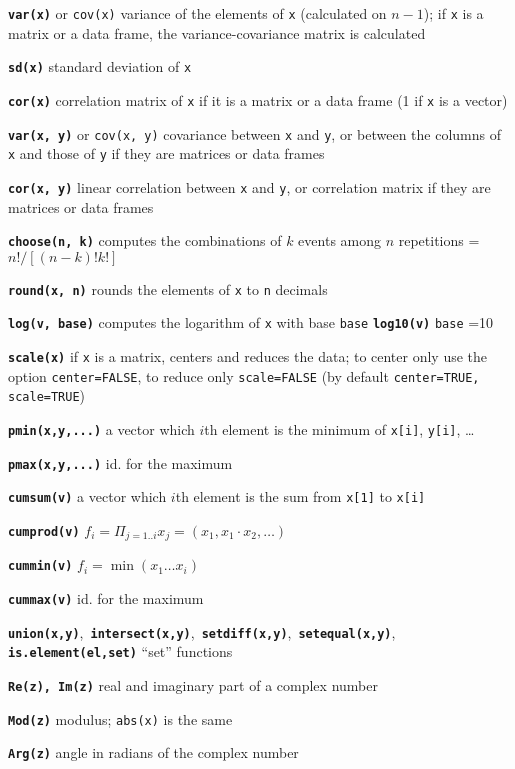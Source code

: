 \documentclass[8pt,landscape]{article}
\newcommand{\code}{\texttt}
\newcommand{\bcode}[1]{\texttt{\textbf{#1}}}
\begin{document}
\begin{multicols*}{3}
\bcode{var(x)} or \code{cov(x)}  variance of the elements of \code{x}
(calculated on $n-1$); if \code{x} is a matrix or a data frame, the
variance-covariance matrix is calculated

\bcode{sd(x)} standard deviation of \code{x}

\bcode{cor(x)}  correlation matrix of \code{x} if it is a matrix or a
data frame (1 if \code{x} is a vector)

\bcode{var(x, y)} or \code{cov(x, y)}  covariance between \code{x} and \code{y}, or between the columns of \code{x} and those of \code{y} if they are matrices or data frames

\bcode{cor(x, y)}  linear correlation between \code{x} and \code{y}, or correlation matrix if they are matrices or data frames

\bcode{choose(n, k)}  computes the combinations of $k$ events among $n$ repetitions = $n!/[(n-k)!k!]$

\bcode{round(x, n)}  rounds the elements of \code{x} to \code{n}
decimals

\bcode{log(v, base)}  computes the logarithm of \code{x} with base \code{base} 
\bcode{log10(v)}  \code{base} =10

\bcode{scale(x)}  if \code{x} is a matrix, centers and reduces the data; to center only use the option \code{center=FALSE}, to reduce only \code{scale=FALSE} (by default \code{center=TRUE, scale=TRUE})

\bcode{pmin(x,y,...)}  a vector which $i$th element is the minimum of \code{x[i]}, \code{y[i]}, \ldots

\bcode{pmax(x,y,...)}  id. for the maximum

\bcode{cumsum(v)}  a vector which $i$th element is the sum from \code{x[1]} to \code{x[i]}

\bcode{cumprod(v)}  $f_i = \Pi_{j=1..i} x_j = (x_1, x_1 \cdot x_2, \dots)$

\bcode{cummin(v)}  $f_i = \min(x_1 \dots x_i)$

\bcode{cummax(v)}  id. for the maximum

\bcode{union(x,y)},~\bcode{intersect(x,y)},~\bcode{setdiff(x,y)},~\bcode{setequal(x,y)}, \bcode{is.element(el,set)} ``set'' functions

\bcode{Re(z), Im(z)} real and imaginary part of a complex number

\bcode{Mod(z)} modulus; \code{abs(x)} is the same

\bcode{Arg(z)} angle in radians of the complex number


\end{multicols*}
\end{document}
